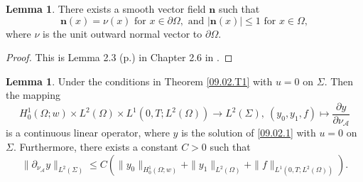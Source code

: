\documentclass[preprint,12pt]{elsarticle}
\theoremstyle{definition}   %
\newtheorem{lemma}[theorem]{Lemma}
\numberwithin{equation}{section}
\def\pt{\partial}
\def\ra{\rightarrow}
\def\bs{\boldsymbol}
\def\pt{\partial}
\def\Om{\Omega}
\def\ts{\times}
\def\f{\frac}
\def\mcA{\mathcal{A}}
\begin{document}
\begin{lemma}\label{09.04.L5}
	There exists a smooth vector field $\bs{n}$ such that 
	\begin{equation*}
		\bs{n}(x)=\nu(x) \mbox{ for } x\in \pt\Om,  \mbox{ and } |\bs{n}(x)|\leq 1 \mbox{ for } x\in \Om, 
	\end{equation*}
	where $\nu$ is the unit outward normal vector to $\pt\Om$. 
\end{lemma}

\begin{proof}
	This is Lemma 2.3 (p.) in Chapter 2.6 in \cite{Bellassoued}. 
\end{proof}

\begin{lemma}\label{09.04.L3}
	Under the conditions in Theorem \ref{09.02.T1} with $u=0$ on $\Sigma$. Then the mapping 
	\begin{equation*}
		H_0^1(\Om;w)\ts L^2(\Om)\ts L^1(0,T; L^2(\Om))\ra L^2(\Sigma), \ (y_0,y_1,f)\mapsto \f{\pt y}{\pt\nu_\mcA}
	\end{equation*}
	is a continuous linear operator, where $y$ is the solution of \eqref{09.02.1} with $u=0$ on $\Sigma$. Furthermore, there exists a constant $C>0$ such that 
	\begin{equation}\label{09.04.6}
		\|\pt_{\nu_\mcA} y\|_{L^2(\Sigma)}\leq C \left(\|y_0\|_{H_0^1(\Om;w)}+\|y_1\|_{L^2(\Om)}+\|f\|_{L^1(0,T; L^2(\Om))}\right).
	\end{equation}
\end{lemma}
\end{document}
